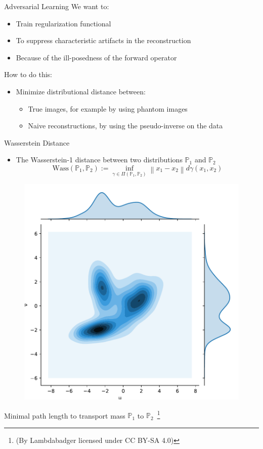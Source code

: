\documentclass{beamer}
\newcommand{\norm}[1]{\left\lVert#1\right\rVert}
\begin{document}
\begin{frame}{Adversarial Learning}
We want to:
\begin{itemize}
\item Train regularization functional 
\item To suppress characteristic artifacts in the reconstruction
\item Because of the ill-posedness of the forward operator
\end{itemize}

\vspace{1cm}

How to do this:
\begin{itemize}
\item Minimize distributional distance between:
\begin{itemize}
\item True images, for example by using phantom images
\item Naive reconstructions, by using the pseudo-inverse on the data
\end{itemize}
\end{itemize}
\end{frame}

\begin{frame}{Wasserstein Distance}
\begin{itemize}
\item The Wasserstein-1 distance between two distributions $\mathbb{P}_{1}$ and $\mathbb{P}_{2}$
$$
\text{Wass}(\mathbb{P}_{1}, \mathbb{P}_{2}) := \inf_{\gamma \in \Pi(\mathbb{P}_{1}, \mathbb{P}_{2})} \norm{x_1 - x_2} d \gamma (x_1, x_2)
$$
\end{itemize}
\begin{center}
\begin{figure}
\includegraphics[width=.4\textwidth]{../figures/transport-plan.pdf}
\end{figure}
Minimal path length to transport mass $\mathbb{P}_1$ to $\mathbb{P}_2$~\footnote{{\tiny \color{blue} (By Lambdabadger licensed under CC BY-SA 4.0)}}
\end{center}
\end{frame}
\end{document}
